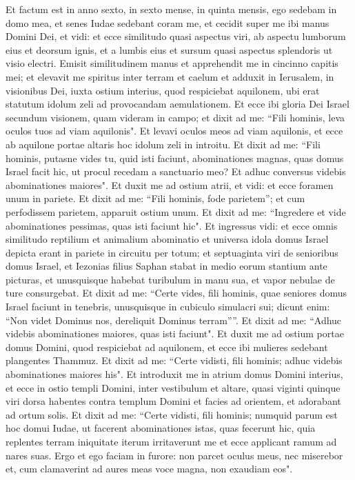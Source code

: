 \begin{biblechapter}  
\verse Et factum est in anno sexto, in sexto mense, in quinta mensis, ego sedebam in domo mea, et senes Iudae sedebant coram me, et cecidit super me ibi manus Domini Dei, 
\verse et vidi: et ecce similitudo quasi aspectus viri, ab aspectu lumborum eius et deorsum ignis, et a lumbis eius et sursum quasi aspectus splendoris ut visio electri. 
\verse Emisit similitudinem manus et apprehendit me in cincinno capitis mei; et elevavit me spiritus inter terram et caelum et adduxit in Ierusalem, in visionibus Dei, iuxta ostium interius, quod respiciebat aquilonem, ubi erat statutum idolum zeli ad provocandam aemulationem. 
\verse Et ecce ibi gloria Dei Israel secundum visionem, quam videram in campo; 
\verse et dixit ad me: “Fili hominis, leva oculos tuos ad viam aquilonis". Et levavi oculos meos ad viam aquilonis, et ecce ab aquilone portae altaris hoc idolum zeli in introitu. 
\verse Et dixit ad me: “Fili hominis, putasne vides tu, quid isti faciunt, abominationes magnas, quas domus Israel facit hic, ut procul recedam a sanctuario meo? Et adhuc conversus videbis abominationes maiores". 
\verse Et duxit me ad ostium atrii, et vidi: et ecce foramen unum in pariete. 
\verse Et dixit ad me: “Fili hominis, fode parietem”; et cum perfodissem parietem, apparuit ostium unum. 
\verse Et dixit ad me: “Ingredere et vide abominationes pessimas, quas isti faciunt hic". 
\verse Et ingressus vidi: et ecce omnis similitudo reptilium et animalium abominatio et universa idola domus Israel depicta erant in pariete in circuitu per totum; 
\verse et septuaginta viri de senioribus domus Israel, et Iezonias filius Saphan stabat in medio eorum stantium ante picturas, et unusquisque habebat turibulum in manu sua, et vapor nebulae de ture consurgebat. 
\verse Et dixit ad me: “Certe vides, fili hominis, quae seniores domus Israel faciunt in tenebris, unusquisque in cubiculo simulacri sui; dicunt enim: “Non videt Dominus nos, dereliquit Dominus terram””. 
\verse Et dixit ad me: “Adhuc videbis abominationes maiores, quas isti faciunt". 
\verse Et duxit me ad ostium portae domus Domini, quod respiciebat ad aquilonem, et ecce ibi mulieres sedebant plangentes Thammuz. 
\verse Et dixit ad me: “Certe vidisti, fili hominis; adhuc videbis abominationes maiores his". 
\verse Et introduxit me in atrium domus Domini interius, et ecce in ostio templi Domini, inter vestibulum et altare, quasi viginti quinque viri dorsa habentes contra templum Domini et facies ad orientem, et adorabant ad ortum solis. 
\verse Et dixit ad me: “Certe vidisti, fili hominis; numquid parum est hoc domui Iudae, ut facerent abominationes istas, quas fecerunt hic, quia replentes terram iniquitate iterum irritaverunt me et ecce applicant ramum ad nares suas. 
\verse Ergo et ego faciam in furore: non parcet oculus meus, nec miserebor et, cum clamaverint ad aures meas voce magna, non exaudiam eos". 
\end{biblechapter}


